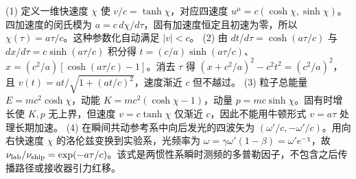 (1) 定义一维快速度 \(\chi\) 使 \(v/c=\tanh\chi\)，对应四速度 \(u^\mu=c(\cosh\chi,\sinh\chi)\)。四加速度的闵氏模为 \(a=c\,d\chi/d\tau\)，固有加速度恒定且初速为零，所以 \(\chi(\tau)=a\tau/c\)。这种参数化自动满足 \(|v|<c\)。
(2) 由 \(dt/d\tau=\cosh(a\tau/c)\) 与 \(dx/d\tau=c\sinh(a\tau/c)\) 积分得 \(t=(c/a)\sinh(a\tau/c)\)、\(x=(c^2/a)[\cosh(a\tau/c)-1]\)。消去 \(\tau\) 得 \((x+c^2/a)^2-c^2t^2=(c^2/a)^2\)，且 \(v(t)=at/\sqrt{1+(at/c)^2}\)，速度渐近 \(c\) 但不越过。
(3) 粒子总能量 \(E=mc^2\cosh\chi\)，动能 \(K=mc^2(\cosh\chi-1)\)，动量 \(p=mc\sinh\chi\)。固有时增长使 \(K,p\) 无上界，但速度 \(v=c\tanh\chi\) 仅渐近 \(c\)，因此不能用牛顿形式 \(v=a\tau\) 处理长期加速。
(4) 在瞬间共动参考系中向后发光的四波矢为 \((\omega'/c,-\omega'/c)\)。用向右快速度 \(\chi\) 的洛伦兹变换到实验系，光频率为 \(\omega=\gamma\omega'(1-\beta)=\omega'e^{-\chi}\)，故 \(\nu_{\rm lab}/\nu_{\rm ship}=\exp(-a\tau/c)\)。该式是两惯性系瞬时测频的多普勒因子，不包含之后传播路径或接收器引力红移。
